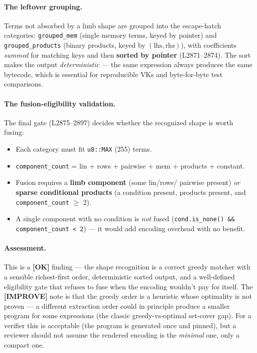 \paragraph{The leftover grouping.}
Terms not absorbed by a limb shape are grouped into the
escape-hatch categories: \texttt{grouped\_mem} (single memory
terms, keyed by pointer) and \texttt{grouped\_products} (binary
products, keyed by $(\text{lhs},\text{rhs})$), with coefficients
\emph{summed} for matching keys and then \textbf{sorted by
pointer} (L2871--2874). The sort makes the output
\emph{deterministic} --- the same expression always produces the
same bytecode, which is essential for reproducible VKs and
byte-for-byte test comparisons.

\paragraph{The fusion-eligibility validation.}
The final gate (L2875--2897) decides whether the recognized shape
is worth fusing:
\begin{itemize}[leftmargin=1.4em,itemsep=2pt]
\item Each category must fit \texttt{u8::MAX} (255) terms.
\item \texttt{component\_count} = lin + rows + pairwise + mem +
  products + constant.
\item Fusion requires a \textbf{limb component} (some lin/rows/
  pairwise present) \emph{or} \textbf{sparse conditional
  products} (a condition present, products present, and
  \texttt{component\_count} $\ge$ 2).
\item A single component with no condition is \emph{not} fused
  (\texttt{cond.is\_\allowbreak{}none() \&\& component\_\allowbreak{}count < 2}) --- it
  would add encoding overhead with no benefit.
\end{itemize}

\paragraph{Assessment.} This is a
\textcolor{tracegreen}{\textbf{[OK]}} finding --- the shape
recognition is a correct greedy matcher with a sensible
richest-first order, deterministic sorted output, and a
well-defined eligibility gate that refuses to fuse when the
encoding wouldn't pay for itself. The
\textcolor{codegenblue}{\textbf{[IMPROVE]}} note is that the
greedy order is a heuristic whose optimality is not proven --- a
different extraction order could in principle produce a smaller
program for some expressions (the classic greedy-vs-optimal
set-cover gap). For a verifier this is acceptable (the program is
generated once and pinned), but a reviewer should not assume the
rendered encoding is the \emph{minimal} one, only a compact one.

